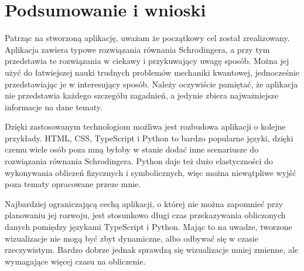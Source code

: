 \documentclass{SGGW-thesis}
\begin{document}
\chapter{Podsumowanie i wnioski}
	Patrząc na stworzoną aplikację, uważam że początkowy cel został zrealizowany. Aplikacja zawiera typowe rozwiązania równania Schrodingera, a przy tym przedstawia te rozwiązania w ciekawy i przykuwający uwagę sposób. Można jej użyć do łatwiejszej nauki trudnych problemów mechaniki kwantowej, jednocześnie przedstawiając je w interesujący sposób. Należy oczywiście pamiętać, że aplikacja nie przedstawia każdego szczegółu zagadnień, a jedynie zbiera najważniejsze informacje na dane tematy.
	
	Dzięki zastosowanym technologiom możliwa jest rozbudowa aplikacji o kolejne przykłady. HTML, CSS, TypeScript i Python to bardzo popularne języki, dzięki czemu wiele osób poza mną byłoby w stanie dodać inne scenariusze do rozwiązania równania Schrodingera. Python daje też dużo elastyczności do wykonywania obliczeń fizycznych i symbolicznych, więc można niewątpliwe wyjść poza tematy opracowane przeze mnie.
	
	Najbardziej ograniczającą cechą aplikacji, o której nie można zapomnieć przy planowaniu jej rozwoju, jest stosunkowo długi czas przekazywania obliczonych danych pomiędzy językami TypeScript i Python. Mając to na uwadze, tworzone wizualizacje nie mogą być zbyt dynamiczne, albo odbywać się w czasie rzeczywistym. Bardzo dobrze jednak sprawdzą się wizualizacje mniej zmienne, ale wymagające więcej czasu na obliczenie.
\end{document}
